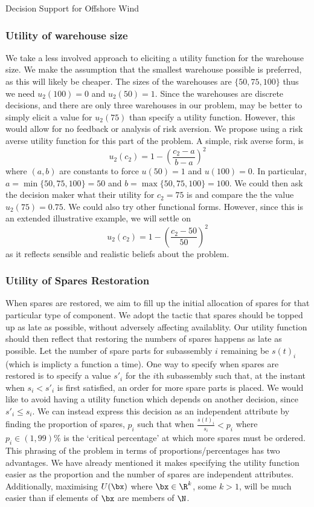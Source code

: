 \begin{chapter}{Decision Support for Offshore Wind \label{Ch:ds-for-ow}}
\subsubsection{Utility of warehouse size}
We take a less involved approach to eliciting a utility function for the warehouse size. We make the assumption that the smallest warehouse possible is preferred, as this will likely be cheaper. The sizes of the warehouses are $\{50, 75, 100\}$ thus we need $u_2(100) = 0$ and $u_2(50) = 1$. Since the warehouses are discrete decisions, and there are only three warehouses in our problem, may be better to simply elicit a value for $u_2(75)$ than specify a utility function. However, this would allow for no feedback or analysis of risk aversion. We propose using a risk averse utility function for this part of the problem. A simple, risk averse form, is
\begin{equation}
  u_2(c_2) = 1 - \left(\frac{c_2  - a}{b - a}\right)^2
\end{equation}
where $(a, b)$ are constants to force $u(50) = 1$ and $u(100) = 0$. In particular, $a = \min \{50, 75, 100 \} =  50$ and $b = \max \{50, 75, 100 \} = 100$. We could then ask the decision maker what their utility for $c_2 = 75$ is and compare the the value $u_2(75) =  0.75$. We could also try other functional forms. However, since this is an extended illustrative example, we will settle on
\begin{equation}
  u_2(c_2) = 1 - \left(\frac{c_2  - 50}{50}\right)^2
\end{equation}
as it reflects sensible and realistic beliefs about the problem.
\subsubsection{Utility of Spares Restoration}
When spares are restored, we aim to fill up the initial allocation of spares for that particular type of component. We adopt the tactic that spares should be topped up as late as possible, without adversely affecting availablity. Our utility function should then reflect that restoring the numbers of spares happens as late as possible. Let the number of spare parts for subassembly $i$ remaining be $s(t)_i$ (which is implicty a function a time). One way to specify when spares are restored is to specify a value $s'_i$ for the $i$th subassembly such that, at the instant when $s_i <  s'_i$ is first satisfied, an order for more spare parts is placed. We would like to avoid having a utility function which depends on another decision, since $s'_i  \leq s_i$. We can instead express this decision as an independent attribute by finding the proportion of spares, $p_i$ such that when $\frac{s(t)_i}{s_i} < p_i$ where $p_i \in (1, 99)\%$ is the `critical percentage' at which more spares must be ordered. This phrasing of the problem in terms of proportions/percentages has two advantages. We have already mentioned it makes specifying the utility function easier as the proportion and the number of spares are independent attributes. Additionally, maximising $U(\bx)$ where $\bx \in \R^k$, some $k>1$, will be much easier than if elements of $\bx$ are members of $\N$.


\end{chapter}
